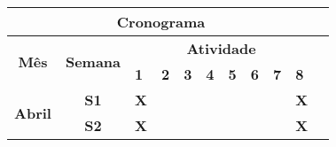 
    

\begin{table}[]
\centering
\begin{tabular}{|clllclllllllllll|}
\hline
\multicolumn{15}{|c|}{\textbf{Cronograma}}                                                                                                                                                                                                                                                                                                                                                                    \\ \hline
\multicolumn{4}{|c|}{\multirow{2}{*}{\textbf{Mês}}}      & \multicolumn{3}{c|}{\multirow{2}{*}{\textbf{Semana}}} & \multicolumn{8}{c|}{\textbf{Atividade}}                                                                                                                                                                                                                                                    \\ \cline{8-15} 
\multicolumn{4}{|c|}{}                                   & \multicolumn{3}{c|}{}                                 & \multicolumn{1}{l|}{\textbf{1}} & \multicolumn{1}{l|}{\textbf{2}} & \multicolumn{1}{l|}{\textbf{3}} & \multicolumn{1}{l|}{\textbf{4}} & \multicolumn{1}{l|}{\textbf{5}} & \multicolumn{1}{l|}{\textbf{6}} & \multicolumn{1}{l|}{\textbf{7}} & \multicolumn{1}{l|}{\textbf{8}}  \\ \hline
\multicolumn{4}{|c|}{\multirow{4}{*}{\textbf{Abril}}}    & \multicolumn{3}{c|}{\textbf{S1}}                      & \multicolumn{1}{l|}{\textbf{X}} & \multicolumn{1}{l|}{\textbf{}}  & \multicolumn{1}{l|}{\textbf{}}  & \multicolumn{1}{l|}{\textbf{}}  & \multicolumn{1}{l|}{\textbf{}}  & \multicolumn{1}{l|}{\textbf{}}  & \multicolumn{1}{l|}{\textbf{}}  & \multicolumn{1}{l|}{\textbf{X}}
\\ \cline{5-15} 
\multicolumn{4}{|c|}{}                                   & \multicolumn{3}{c|}{\textbf{S2}}                      & \multicolumn{1}{l|}{\textbf{X}} & \multicolumn{1}{l|}{\textbf{}}  & \multicolumn{1}{l|}{\textbf{}}  & \multicolumn{1}{l|}{\textbf{}}  & \multicolumn{1}{l|}{\textbf{}}  & \multicolumn{1}{l|}{\textbf{}}  & \multicolumn{1}{l|}{\textbf{}}  & \multicolumn{1}{l|}{\textbf{X}}

\end{tabular}
\end{table}
